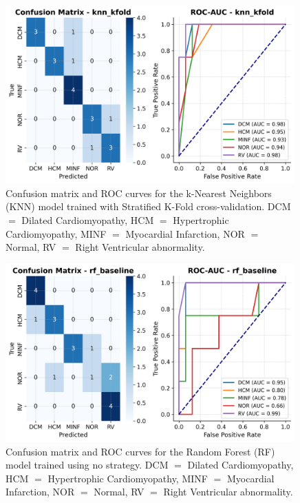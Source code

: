 \begin{figure}
	\begin{center}
		\includegraphics[width=0.99\textwidth]{../images/metrics/knn/knn_kfold_metrics.png}
	\end{center}
	\caption{Confusion matrix and ROC curves for the k-Nearest Neighbors (KNN)
		model trained with Stratified K-Fold cross-validation. DCM $=$ Dilated
		Cardiomyopathy, HCM $=$ Hypertrophic Cardiomyopathy, MINF $=$ Myocardial
		Infarction, NOR $=$ Normal, RV $=$ Right Ventricular abnormality.}
\end{figure}

\begin{figure}
	\begin{center}
		\includegraphics[width=0.99\textwidth]{../images/metrics/rf/rf_baseline_metrics.png}
	\end{center}
	\caption{Confusion matrix and ROC curves for the Random Forest (RF) model
		trained using no strategy. DCM $=$ Dilated Cardiomyopathy, HCM $=$
		Hypertrophic Cardiomyopathy, MINF $=$ Myocardial Infarction, NOR $=$ Normal, RV
		$=$ Right Ventricular abnormality.}
\end{figure}

